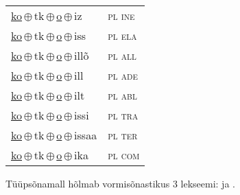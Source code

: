 \begin{minipage}{\textwidth}
\begin{sideways}
\begin{tabular}{l l}
\underline{ko}\,$\oplus$\,tk\,$\oplus$\,\underline{o}\,$\oplus$\,iz & \textsc{ pl ine } \\
\underline{ko}\,$\oplus$\,tk\,$\oplus$\,\underline{o}\,$\oplus$\,iss & \textsc{ pl ela } \\
\underline{ko}\,$\oplus$\,tk\,$\oplus$\,\underline{o}\,$\oplus$\,illõ & \textsc{ pl all } \\
\underline{ko}\,$\oplus$\,tk\,$\oplus$\,\underline{o}\,$\oplus$\,ill & \textsc{ pl ade } \\
\underline{ko}\,$\oplus$\,tk\,$\oplus$\,\underline{o}\,$\oplus$\,ilt & \textsc{ pl abl } \\
\underline{ko}\,$\oplus$\,tk\,$\oplus$\,\underline{o}\,$\oplus$\,issi & \textsc{ pl tra } \\
\underline{ko}\,$\oplus$\,tk\,$\oplus$\,\underline{o}\,$\oplus$\,issaa & \textsc{ pl ter } \\
\underline{ko}\,$\oplus$\,tk\,$\oplus$\,\underline{o}\,$\oplus$\,ika & \textsc{ pl com } \\
\end{tabular}
\end{sideways}
\label{tab:tüüpsõnamall-kotko}

\end{minipage}

 
\vspace{1em}
\noindent Tüüpsõnamall  hõlmab vormisõnastikus 3 lekseemi:  ja .
